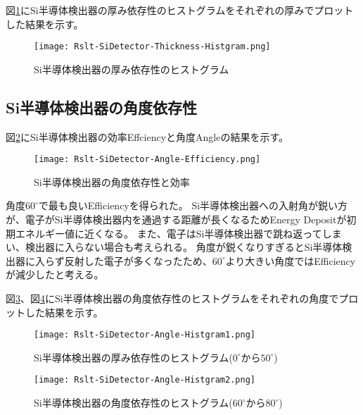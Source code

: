 \documentclass[a4paper,10pt]{jreport}
\begin{document}
図\ref{Rslt-SiDetector-Thickness-Histgram}にSi半導体検出器の厚み依存性のヒストグラムをそれぞれの厚みでプロットした結果を示す。

\begin{figure}[H]
	\center
	\texttt{[image: Rslt-SiDetector-Thickness-Histgram.png]}
	\caption{Si半導体検出器の厚み依存性のヒストグラム} \label{Rslt-SiDetector-Thickness-Histgram}
\end{figure}



\subsection{Si半導体検出器の角度依存性}

図\ref{Rslt-SiDetector-Angle-Efficiency}にSi半導体検出器の効率Effciencyと角度Angleの結果を示す。
	
\begin{figure}[H]
	\center
	\texttt{[image: Rslt-SiDetector-Angle-Efficiency.png]}
	\caption{Si半導体検出器の角度依存性と効率} \label{Rslt-SiDetector-Angle-Efficiency}
\end{figure}

角度$60^{\circ}$で最も良いEfficiencyを得られた。
Si半導体検出器への入射角が鋭い方が、電子がSi半導体検出器内を通過する距離が長くなるためEnergy Depositが初期エネルギー値に近くなる。
また、電子はSi半導体検出器で跳ね返ってしまい、検出器に入らない場合も考えられる。
角度が鋭くなりすぎるとSi半導体検出器に入らず反射した電子が多くなったため、$60^{\circ}$より大きい角度ではEfficiencyが減少したと考える。

図\ref{Rslt-SiDetector-Angle-Histgram1}、図\ref{Rslt-SiDetector-Angle-Histgram2}にSi半導体検出器の角度依存性のヒストグラムをそれぞれの角度でプロットした結果を示す。

\begin{figure}[H]
	\center
	\texttt{[image: Rslt-SiDetector-Angle-Histgram1.png]}
	\caption{Si半導体検出器の厚み依存性のヒストグラム($0^{\circ}$から$50^{\circ}$)} \label{Rslt-SiDetector-Angle-Histgram1}
\end{figure}

\begin{figure}[H]
	\center
	\texttt{[image: Rslt-SiDetector-Angle-Histgram2.png]}
	\caption{Si半導体検出器の角度依存性のヒストグラム($60^{\circ}$から$80^{\circ}$)} \label{Rslt-SiDetector-Angle-Histgram2}
\end{figure}
\end{document}
